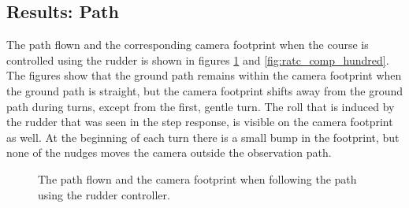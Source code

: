 \subsection{Results: Path}

The path flown and the corresponding camera footprint when the course is controlled using the rudder is shown in figures \ref{fig:ratc_path_hundred} and \ref{fig:ratc_comp_hundred}. The figures show that the ground path remains within the camera footprint when the ground path is straight, but the camera footprint shifts away from the ground path during turns, except from the first, gentle turn. The roll that is induced by the rudder that was seen in the step response, is visible on the camera footprint as well. At the beginning of each turn there is a small bump in the footprint, but none of the nudges moves the camera outside the observation path.

\begin{figure}[]
    \centering
    \caption{The path flown and the camera footprint when following the path using the rudder controller.}
	\label{fig:ratc_path_hundred}
\end{figure}

